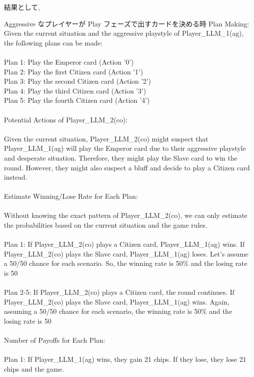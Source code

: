 \documentclass{jarticle}     %
\begin{document}
結果として, 
\begin{itembox}[l]{Aggressive なプレイヤーが Play フェーズで出すカードを決める時}
  Plan Making:
\\
    Given the current situation and the aggressive playstyle of Player_LLM_1(ag), the following plans can be made:
\\
\\Plan 1: Play the Emperor card (Action '0')
\\Plan 2: Play the first Citizen card (Action '1')
\\Plan 3: Play the second Citizen card (Action '2')
\\Plan 4: Play the third Citizen card (Action '3')
\\Plan 5: Play the fourth Citizen card (Action '4')
\\
\\Potential Actions of Player_LLM_2(co):
\\
\\Given the current situation, Player_LLM_2(co) might suspect that Player_LLM_1(ag) will play the Emperor card due to their aggressive playstyle and desperate situation. Therefore, they might play the Slave card to win the round. However, they might also suspect a bluff and decide to play a Citizen card instead. 
\\
\\Estimate Winning/Lose Rate for Each Plan:
\\
\\Without knowing the exact pattern of Player_LLM_2(co), we can only estimate the probabilities based on the current situation and the game rules. 
\\
\\Plan 1: If Player_LLM_2(co) plays a Citizen card, Player_LLM_1(ag) wins. If Player_LLM_2(co) plays the Slave card, Player_LLM_1(ag) loses. Let's assume a 50/50 chance for each scenario. So, the winning rate is 50\% and the losing rate is 50%
\\
\\Plan 2-5: If Player_LLM_2(co) plays a Citizen card, the round continues. If Player_LLM_2(co) plays the Slave card, Player_LLM_1(ag) wins. Again, assuming a 50/50 chance for each scenario, the winning rate is 50\% and the losing rate is 50%
\\
\\Number of Payoffs for Each Plan:
\\
\\Plan 1: If Player_LLM_1(ag) wins, they gain 21 chips. If they lose, they lose 21 chips and the game.

\end{itembox}
\end{document}
